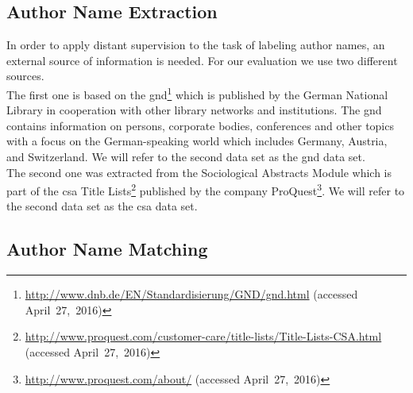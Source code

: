 \subsection{Author Name Extraction}

In order to apply distant supervision to the task of labeling author names, an external source of information is needed.
For our evaluation we use two different sources.\\

The first one is based on the \acrfull{gnd}\footnote{\url{http://www.dnb.de/EN/Standardisierung/GND/gnd.html} (accessed April~27,~2016)} which is published by the German National Library in cooperation with other library networks and institutions.
The \gls{gnd} contains information on persons, corporate bodies, conferences and other topics with a focus on the German-speaking world which includes Germany, Austria, and Switzerland.
We will refer to the second data set as the \gls{gnd} data set.\\

The second one was extracted from the Sociological Abstracts Module which is part of the \gls{csa} Title Lists\footnote{\url{http://www.proquest.com/customer-care/title-lists/Title-Lists-CSA.html} (accessed April~27,~2016)} published by the company ProQuest\footnote{\url{http://www.proquest.com/about/} (accessed April~27,~2016)}.
We will refer to the second data set as the \gls{csa} data set.

\subsection{Author Name Matching}



